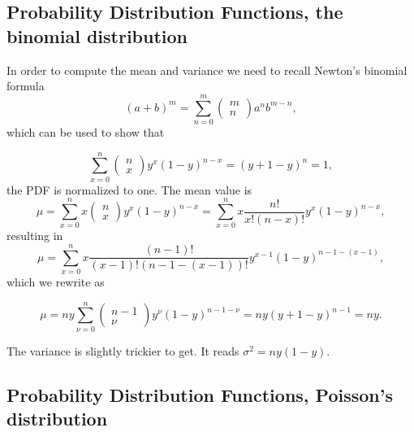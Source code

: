 \documentclass[%
oneside,                 %
final,                   %
10pt]{article}
\newenvironment{block_mdfboxadmon}[1][]{
\begin{block_mdfboxmdframed}[frametitle=#1]
}
{
\end{block_mdfboxmdframed}
}
\begin{document}
\subsection{Probability Distribution Functions, the binomial distribution}

\begin{block_mdfboxadmon}[]

In order to compute the mean and variance we need to recall Newton's binomial
formula
\begin{equation*}
   (a+b)^m=\sum_{n=0}^m \left(\begin{array}{c} m \\ n\end{array}\right)a^nb^{m-n},
\end{equation*}
which can be used to show that

\begin{equation*}
\sum_{x=0}^n\left(\begin{array}{c} n \\ x\end{array}\right)y^x(1-y)^{n-x} = (y+1-y)^n = 1,
\end{equation*}
the PDF is normalized to one. 
The mean value is
\begin{equation*}
\mu = \sum_{x=0}^n x\left(\begin{array}{c} n \\ x\end{array}\right)y^x(1-y)^{n-x} =
\sum_{x=0}^n x\frac{n!}{x!(n-x)!}y^x(1-y)^{n-x}, 
\end{equation*}
resulting in
\begin{equation*}
\mu = 
\sum_{x=0}^n x\frac{(n-1)!}{(x-1)!(n-1-(x-1))!}y^{x-1}(1-y)^{n-1-(x-1)},
\end{equation*}
which we rewrite as

\begin{equation*}
\mu=ny\sum_{\nu=0}^n\left(\begin{array}{c} n-1 \\ \nu\end{array}\right)y^{\nu}(1-y)^{n-1-\nu} =ny(y+1-y)^{n-1}=ny. 
\end{equation*}
\end{block_mdfboxadmon} %


The variance is slightly trickier to get. It reads $\sigma^2=ny(1-y)$. 

\subsection{Probability Distribution Functions, Poisson's  distribution}
\end{document}
